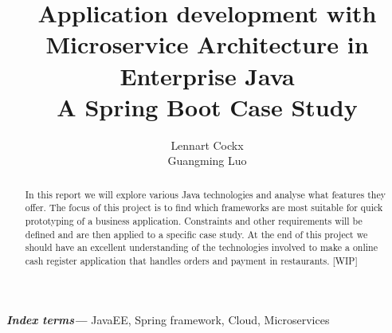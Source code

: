 \documentclass[12pt]{article}
\title{Application development with\\ Microservice Architecture in Enterprise Java\\ A Spring Boot Case Study}
\author{Lennart Cockx\\Guangming Luo}
\providecommand{\keywords}[1]{\textbf{\textit{Index terms---}} #1}
\begin{document}
\maketitle
\newpage
\tableofcontents
\newpage

\begin{abstract}
\noindent In this report we will explore various Java technologies and analyse what features they offer. The focus of this project is to find which frameworks are most suitable for quick prototyping of a business application. Constraints and other requirements will be defined and are then applied to a specific case study. At the end of this project we should have an excellent understanding of the technologies involved to make a online cash register application that handles orders and payment in restaurants. [WIP]
\end{abstract}
\keywords{JavaEE, Spring framework, Cloud, Microservices}


\end{document}
